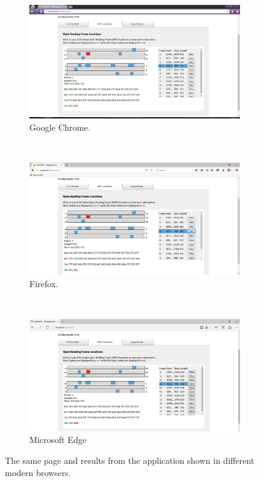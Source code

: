 \begin{figure}[H]
    \centering
    \begin{subfigure}[b]{0.4\textwidth}
        \includegraphics[width=\textwidth]{images/browserchrome}
        \caption{Google Chrome.}
    \end{subfigure}
    ~ %
    \begin{subfigure}[b]{0.4\textwidth}
        \includegraphics[width=\textwidth]{images/browserffox}
        \caption{Firefox.}
    \end{subfigure}
    ~ %
    \begin{subfigure}[b]{0.4\textwidth}
        \includegraphics[width=\textwidth]{images/browseredge}
        \caption{Microsoft Edge}
    \end{subfigure}
    \caption{The same page and results from the application shown in different modern browsers.}
\end{figure}

